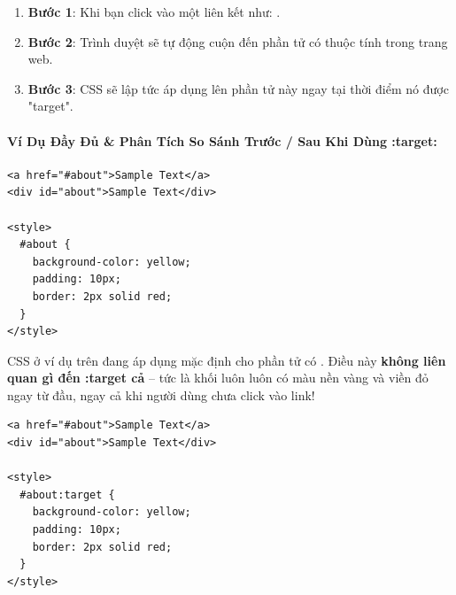 \begin{conceptBox}
\begin{enumerate}[leftmargin=1.5em, itemsep=3pt, parsep=0pt]
    \item \textbf{Bước 1}: Khi bạn click vào một liên kết như: .
    \item \textbf{Bước 2}: Trình duyệt sẽ tự động cuộn đến phần tử có thuộc tính  trong trang web.
    \item \textbf{Bước 3}: CSS  sẽ lập tức áp dụng lên phần tử này ngay tại thời điểm nó được "target".
\end{enumerate}
\end{conceptBox}

\paragraph{Ví Dụ Đầy Đủ \& Phân Tích So Sánh Trước / Sau Khi Dùng :target:}

\begin{codeWindow}
\begin{lstlisting}[language=HTML5]
<a href="#about">Sample Text</a>
<div id="about">Sample Text</div>

<style>
  #about {
    background-color: yellow;
    padding: 10px;
    border: 2px solid red;
  }
</style>
\end{lstlisting}
\end{codeWindow}

\begin{warnBox}
CSS ở ví dụ trên đang áp dụng mặc định cho phần tử có . Điều này \textbf{không liên quan gì đến :target cả} -- tức là khối  luôn luôn có màu nền vàng và viền đỏ ngay từ đầu, ngay cả khi người dùng chưa click vào link!
\end{warnBox}

\begin{codeWindow}
\begin{lstlisting}[language=HTML5]
<a href="#about">Sample Text</a>
<div id="about">Sample Text</div>

<style>
  #about:target {
    background-color: yellow;
    padding: 10px;
    border: 2px solid red;
  }
</style>
\end{lstlisting}
\end{codeWindow}


